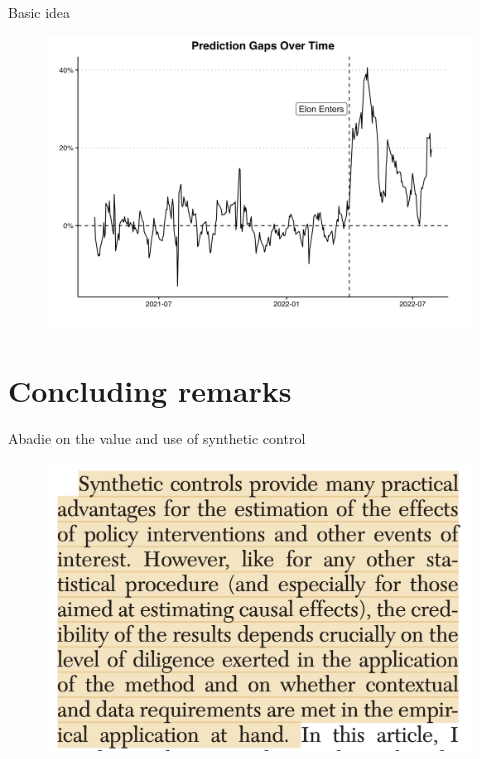 \documentclass{beamer}
\begin{document}
\begin{frame}{Basic idea}

\begin{figure}
\includegraphics[scale=0.35]{./lecture_includes/baker_gelbach_4}
\end{figure}
\end{frame}

\section{Concluding remarks}


\begin{frame}{Abadie on the value and use of synthetic control}

	\begin{figure}
	\includegraphics[scale=0.5]{./lecture_includes/abadie_quote.png}
	\end{figure}

\end{frame}
\end{document}
